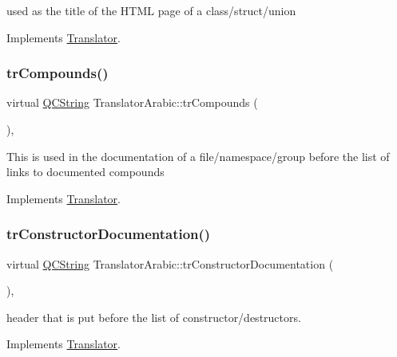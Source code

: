 used as the title of the H\+T\+ML page of a class/struct/union 

Implements \mbox{\hyperlink{class_translator}{Translator}}.

\mbox{\label{class_translator_arabic_a08ecec2f5aa2069025984ad039b594bd}} 
\subsubsection{\texorpdfstring{trCompounds()}{trCompounds()}}
{\footnotesize\ttfamily virtual \mbox{\hyperlink{class_q_c_string}{Q\+C\+String}} Translator\+Arabic\+::tr\+Compounds (\begin{DoxyParamCaption}{ }\end{DoxyParamCaption})\hspace{0.3cm}{\ttfamily [inline]}, {\ttfamily [virtual]}}

This is used in the documentation of a file/namespace/group before the list of links to documented compounds 

Implements \mbox{\hyperlink{class_translator}{Translator}}.

\mbox{\label{class_translator_arabic_af0b71c62bd906419d092565d64546aff}} 
\subsubsection{\texorpdfstring{trConstructorDocumentation()}{trConstructorDocumentation()}}
{\footnotesize\ttfamily virtual \mbox{\hyperlink{class_q_c_string}{Q\+C\+String}} Translator\+Arabic\+::tr\+Constructor\+Documentation (\begin{DoxyParamCaption}{ }\end{DoxyParamCaption})\hspace{0.3cm}{\ttfamily [inline]}, {\ttfamily [virtual]}}

header that is put before the list of constructor/destructors. 

Implements \mbox{\hyperlink{class_translator}{Translator}}.

\mbox{\label{class_translator_arabic_a6de935804cfbbf90e35d06b8a94e78c4}} 
